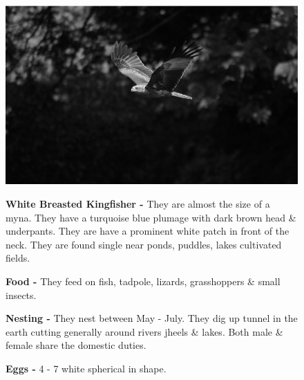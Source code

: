\begin{figure}[H]
\begin{center}
\includegraphics{figure/Land_birds/01_pariah_kite/pariah-kite.eps}
\end{center}
\medskip
\noindent
{\bf White Breasted Kingfisher -} They are almost the size of a myna. They have a turquoise blue plumage with dark brown head \& underpants. They are have a prominent white patch in front of the neck. They are found single near ponds, puddles, lakes cultivated fields.

\medskip
{\bf Food -} They feed on fish, tadpole, lizards, grasshoppers \& small insects.

{\bf Nesting -} They nest between May - July. They dig up tunnel in the earth cutting generally around rivers jheels \& lakes. Both male \& female share the domestic duties.

{\bf Eggs -} 4 - 7 white spherical in shape.
\end{figure}

\vfill\eject

~\phantom{a}
\vfill

